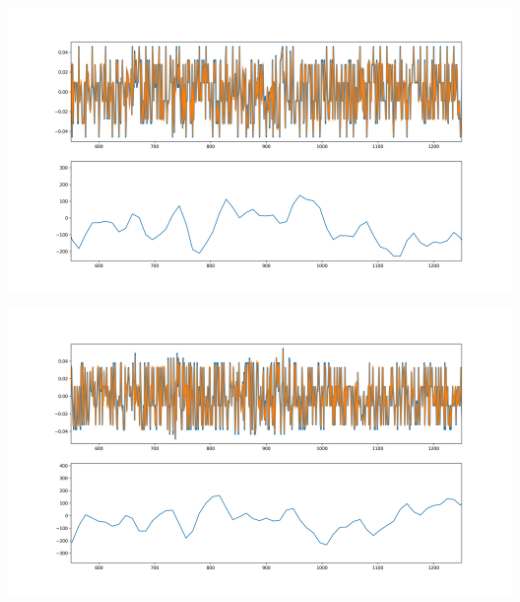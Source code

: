 \documentclass[11pt]{scrartcl} %
\begin{document}
\begin{preview}
\begin{minipage}{\linewidth}
	\begin{center}
		\includegraphics[width=1\columnwidth,trim={0 0.5cm 1cm 0.5cm},clip]{../../Linux/Trabajo/FullSystemCCTb/imgs/vsOctave2re.png} %
	\end{center}
	\label{modo2eqre}
\end{minipage}

\begin{minipage}{\linewidth}
	\begin{center}
		\includegraphics[width=1\columnwidth,trim={0 0.5cm 1cm 0.5cm},clip]{../../Linux/Trabajo/FullSystemCCTb/imgs/vsOctave2im.png} %
	\end{center}
	\label{modo2eqim}
\end{minipage}


\end{preview}
\end{document}
